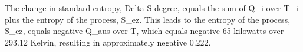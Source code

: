 The change in standard entropy, Delta S degree, equals the sum of Q_i over T_i plus the entropy of the process, S_ez. This leads to the entropy of the process, S_ez, equals negative Q_aus over T, which equals negative 65 kilowatts over 293.12 Kelvin, resulting in approximately negative 0.222.
